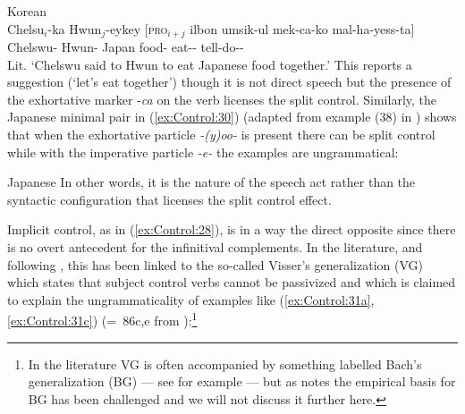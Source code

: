 \documentclass[output=paper,hidelinks]{langscibook}
\begin{document}
\ea\label{ex:Control:29}Korean\\\gll
Chelsu$_i$-ka   Hwun$_j$-eykey [\textsc{pro}$_{i+j}$ ilbon  umsik-ul mek-ca-ko mal-ha-yess-ta]\\
{Chelswu-\NOM}  {Hwun-\DAT}     {} Japan  {food-\ACC} eat-- {tell-do-\PST-\DECL}\\
\glt Lit. `Chelswu said to Hwun to eat Japanese food together.'
\z
This reports a suggestion (`let's eat together') though it is not direct speech but the presence of the exhortative marker -\emph{ca} on the verb licenses the split control. Similarly, the Japanese minimal pair in (\ref{ex:Control:30}) (adapted from example (38) in \citealt{Fujii2010}) shows that when the exhortative particle \emph{-(y)oo-} is present there can be split control while with the imperative particle \emph{-e-} the examples are ungrammatical:


\ea\label{ex:Control:30}Japanese
\z\z
In other words, it is the nature of the speech act rather than the syntactic configuration that licenses the split control effect.

Implicit control, as in (\ref{ex:Control:28}), is in a way the direct opposite since there is no overt antecedent for the infinitival complements. In the literature, and following \citet{bresnan1982control-complementation}, this has been linked to the so-called Visser's generalization (VG) which states that subject control verbs cannot be passivized and which is claimed to explain the ungrammaticality of examples like (\ref{ex:Control:31a},\ref{ex:Control:31c}) (=~86c,e from \citealt{bresnan1982control-complementation}):\footnote{In the literature VG is often accompanied by something labelled Bach's generalization (BG) --- see for example \citet[586]{DLM:LFG} --- but as \citet[179--179]{Landau2013} notes the empirical basis for BG has been challenged and we will not discuss it further here.}
\end{document}
